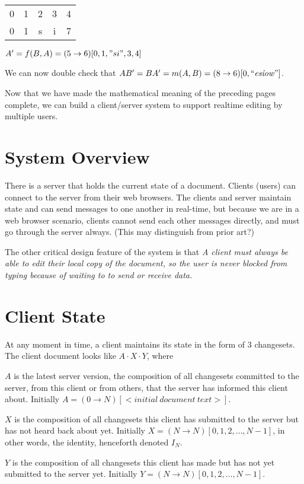 \documentclass{article}
\begin{document}
\begin{tabular}{ccccc}
0 & 1 & 2 & 3 & 4 \\
0 & 1 & s & i & 7
\end{tabular}

$A'=f(B,A)=(5\rightarrow 6)[0,1,"si",3,4]$

We can now double check that $AB'=BA'=m(A,B)=(8\rightarrow 6)[0,``\mathit{esiow}"]$.

Now that we have made the mathematical meaning of the
preceding pages complete, we can build a client/server
system to support realtime editing by multiple users.

\section{System Overview}

There is a server that holds the current state of a
document.  Clients (users) can connect to the server from
their web browsers.  The clients and server maintain state
and can send messages to one another in real-time, but
because we are in a web browser scenario, clients cannot
send each other messages directly, and must go through the
server always.  (This may distinguish from prior art?)

The other critical design feature of the system is that
\emph{A client must always be able to edit their local
  copy of the document, so the user is never blocked from
  typing because of waiting to to send or receive data.}

\section{Client State}

At any moment in time, a client maintains its state in the
form of 3 changesets.  The client document looks like
$A\cdot X \cdot Y$, where

$A$ is the latest server version, the composition of all
changesets committed to the server, from this client or
from others, that the server has informed this client
about.  Initially $A=(0\rightarrow N)[<\mathit{initial\ document\ text}>]$.

$X$ is the composition of all changesets this client has
submitted to the server but has not heard back about yet.
Initially $X=(N\rightarrow N)[0,1,2,\ldots, N-1]$, in
other words, the identity, henceforth denoted $I_N$.

$Y$ is the composition of all changesets this client has
made but has not yet submitted to the server yet.
Initially $Y=(N\rightarrow N)[0,1,2,\ldots, N-1]$.
\end{document}
